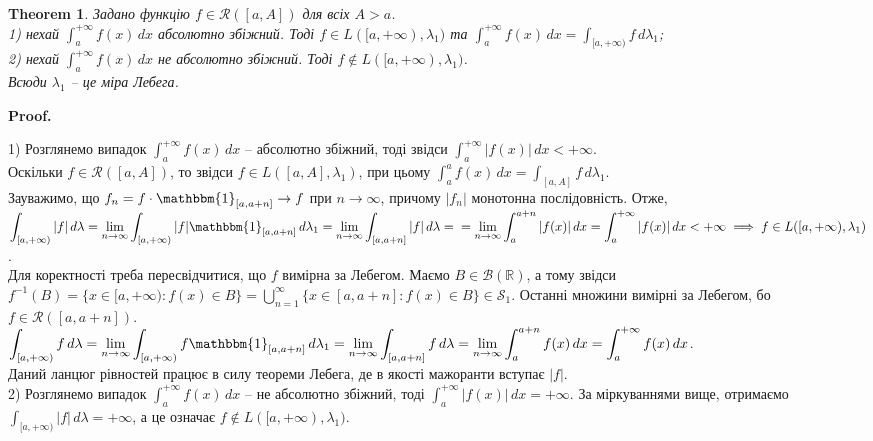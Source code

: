 \documentclass[a4paper, 10pt]{article}
\makeatletter
\theoremstyle{theoremdd}
\newtheorem{theorem}{Theorem}[subsection]
\renewenvironment{proof}[1][Proof.\\]{\par
\pushQED{\hfill \qed}%
\normalfont \topsep6\p@\@plus6\p@\relax
\trivlist
\item\relax
{\bfseries
#1\@addpunct{.}}\hspace\labelsep\ignorespaces
}{%
\popQED\endtrivlist\@endpefalse
}
\makeatother
\begin{document}
\begin{theorem}
Задано функцію $f \in \mathcal{R}([a,A])$ для всіх $A > a$.\\
1) нехай $\displaystyle\int_a^{+\infty} f(x)\,dx$ абсолютно збіжний. Тоді $f \! \in \! L([a,+\infty),\lambda_1)$ та $\displaystyle\int_a^{+\infty} f(x)\,dx = \int_{[a,+\infty)} f\,d\lambda_1$;\\
2) нехай $\displaystyle\int_a^{+\infty} f(x)\,dx$ не абсолютно збіжний. Тоді $f \notin L([a,+\infty),\lambda_1)$.\\
Всюди $\lambda_1$ -- це міра Лебега. 
\end{theorem}

\begin{proof}
1) Розглянемо випадок $\displaystyle\int_a^{+\infty} f(x)\,dx$ -- абсолютно збіжний, тоді звідси $\displaystyle\int_a^{+\infty} |f(x)|\,dx < +\infty$.\\
Оскільки $f \in \mathcal{R}([a,A])$, то звідси $f \in L([a,A],\lambda_1)$, при цьому $\displaystyle\int_a^a f(x)\,dx = \int_{[a,A]} f\,d\lambda_1$.\\
Зауважимо, що $f_n = f \cdot \mathbbm{1}_{[a,a+n]} \to f$ при $n \to \infty$, причому $|f_n|$ монотонна послідовність. Отже,\\
$\displaystyle\int_{[a,+\infty)} |f|\,d\lambda = \lim_{n \to \infty} \int_{[a,+\infty)} |f| \mathbbm{1}_{[a,a+n]}\,d\lambda_1 = \lim_{n \to \infty}\int_{[a,a+n]} |f|\,d\lambda = \\ =\lim_{n \to \infty} \int_a^{a+n} |f(x)|\,dx = \int_a^{+\infty} |f(x)|\,dx < +\infty \implies f \in L([a,+\infty),\lambda_1)$.\\
Для коректності треба пересвідчитися, що $f$ вимірна за Лебегом. Маємо $B \in \mathcal{B}(\mathbb{R})$, а тому звідси\\
$f^{-1}(B) = \{x \in [a,+\infty) : f(x) \in B\} = \displaystyle\bigcup_{n=1}^\infty \{x \in [a,a+n]: f(x) \in B\} \in \mathcal{S}_1$. Останні множини вимірні за Лебегом, бо $f \in \mathcal{R}([a,a+n])$.\\
$\displaystyle\int_{[a,+\infty)} f\,d\lambda = \lim_{n \to \infty} \int_{[a,+\infty)} f \mathbbm{1}_{[a,a+n]}\,d\lambda_1 = \lim_{n \to \infty}\int_{[a,a+n]} f\,d\lambda = \lim_{n \to \infty} \int_a^{a+n} f(x)\,dx = \int_a^{+\infty} f(x)\,dx$.\\
Даний ланцюг рівностей працює в силу теореми Лебега, де в якості мажоранти вступає $|f|$.
\bigskip \\
2) Розглянемо випадок $\displaystyle\int_a^{+\infty} f(x)\,dx$ -- не абсолютно збіжний, тоді $\displaystyle\int_a^{+\infty} |f(x)|\,dx = +\infty$. За міркуваннями вище, отримаємо $\displaystyle\int_{[a,+\infty)} |f|\,d\lambda = +\infty$, а це означає $f \notin L([a,+\infty),\lambda_1)$.
\end{proof}
\end{document}
